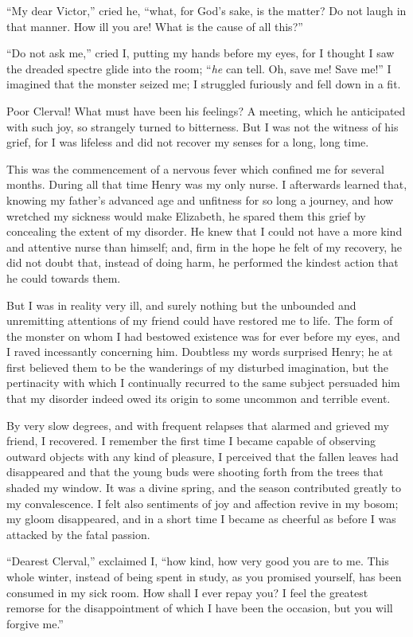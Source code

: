\documentclass[12pt,openright]{book}
\begin{document}
“My dear Victor,” cried he, “what, for God’s sake, is the matter? Do not laugh in that manner. How ill you are! What is the cause of all this?”

“Do not ask me,” cried I, putting my hands before my eyes, for I thought I saw the dreaded spectre glide into the room; “\textit{he} can tell. Oh, save me! Save me!” I imagined that the monster seized me; I struggled furiously and fell down in a fit.

Poor Clerval! What must have been his feelings? A meeting, which he anticipated with such joy, so strangely turned to bitterness. But I was not the witness of his grief, for I was lifeless and did not recover my senses for a long, long time.

This was the commencement of a nervous fever which confined me for several months. During all that time Henry was my only nurse. I afterwards learned that, knowing my father’s advanced age and unfitness for so long a journey, and how wretched my sickness would make Elizabeth, he spared them this grief by concealing the extent of my disorder. He knew that I could not have a more kind and attentive nurse than himself; and, firm in the hope he felt of my recovery, he did not doubt that, instead of doing harm, he performed the kindest action that he could towards them.

But I was in reality very ill, and surely nothing but the unbounded and unremitting attentions of my friend could have restored me to life. The form of the monster on whom I had bestowed existence was for ever before my eyes, and I raved incessantly concerning him. Doubtless my words surprised Henry; he at first believed them to be the wanderings of my disturbed imagination, but the pertinacity with which I continually recurred to the same subject persuaded him that my disorder indeed owed its origin to some uncommon and terrible event.

By very slow degrees, and with frequent relapses that alarmed and grieved my friend, I recovered. I remember the first time I became capable of observing outward objects with any kind of pleasure, I perceived that the fallen leaves had disappeared and that the young buds were shooting forth from the trees that shaded my window. It was a divine spring, and the season contributed greatly to my convalescence. I felt also sentiments of joy and affection revive in my bosom; my gloom disappeared, and in a short time I became as cheerful as before I was attacked by the fatal passion.

“Dearest Clerval,” exclaimed I, “how kind, how very good you are to me. This whole winter, instead of being spent in study, as you promised yourself, has been consumed in my sick room. How shall I ever repay you? I feel the greatest remorse for the disappointment of which I have been the occasion, but you will forgive me.”
\end{document}

